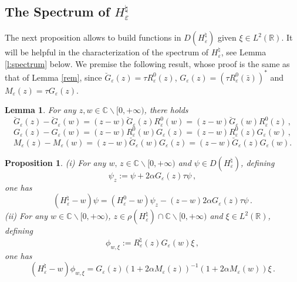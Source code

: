 \documentclass[a4paper,11pt,reqno]{amsart}
\newtheorem{lemma}[theorem]{Lemma}
\newtheorem{proposition}[theorem]{Proposition}
\theoremstyle{definition}
\numberwithin{equation}{section}
\newcommand{\CO}{\mathbb C}
\newcommand{\RE}{\mathbb R}
\newcommand{\ve}{\varepsilon}
\newcommand{\bosfer}{{\natural}}
\begin{document}
\subsection{The Spectrum of \texorpdfstring{$H^\bosfer_\ve$}{Hve}\label{ss:spectrum}}
The next proposition allows to build functions in $D(H^\bosfer_\ve)$ given $\xi \in L^2(\RE)$. It will be helpful in the characterization of the spectrum of $H^\bosfer_\ve$, see Lemma \ref{l:spectrum} below. We premise the following result, whose proof is the same as that of Lemma \ref{rem}, since 
 $\breve G_{\ve}(z)=\tau R^{0}_{\ve}(z)$, $G_{\ve}(z)=(\tau R^{0}_{\ve}(\bar z))^{*}$ and $M_{\ve}(z)=\tau G_{\ve}(z)$.
\begin{lemma} For any $z,w\in \CO\backslash[0,+\infty)$, there holds
\begin{equation*}%
\breve G_{\ve} (z)  - \breve G_\ve (w) = (z-w) \breve G_{\ve} (z) R^{0}_{\ve} (w) = (z-w)\breve G_{\ve} (w)R^{0}_{\ve} (z)\,,
\end{equation*}
\begin{equation}\label{resid3-b}
 G_{\ve} (z)  -  G_\ve (w) = (z-w)  R^{0}_{\ve} (w)  G_{\ve} (z) = (z-w)  R^{0}_{\ve} (z)G_{\ve} (w)\,,
\end{equation}
\begin{equation}\label{Mb_prop2-b}
 M_{\ve} (z)  -  M_\ve (w) = (z-w)  \breve G_{\ve} (w)  G_{\ve} (z) = (z-w)  \breve G_{\ve}  (z)G_{\ve} (w).
\end{equation}  
\end{lemma}
\begin{proposition}\label{p:decomposition} (i) For any $w,\,z\in  \CO\backslash[0,+\infty)$ and $\psi\in D(H^\bosfer_\ve)$, defining 
\[
\psi_{z}:=\psi+2\alpha G_{\ve}(z)\tau\psi\,,
\]
one has 
\[
(H^\bosfer_\ve -w ) \psi = (H^{0}_{\ve} -w)\psi_{z}-(z-w) 2\alpha G_{\ve}(z)\tau\psi\,.
\]
(ii) For any $w \in \CO\backslash[0,+\infty)$, $z\in  \rho(H^\bosfer_\ve)\cap \CO\backslash[0,+\infty)$ and $\xi \in  L^2(\RE)$, defining 
\[
\phi_{w,\xi}:=R^{\bosfer}_{\ve}(z)G_{\ve}(w)\xi\,,
\]
one has
\[
(H^\bosfer_\ve - w)\phi_{w,\xi}=  G_\ve (z) \left( 1  + 2\alpha M_{\ve}(z)\right)^{-1} \left( 1  +2\alpha M_{\ve}(w)\right) \xi\,.
\]
\end{proposition}
\end{document}

